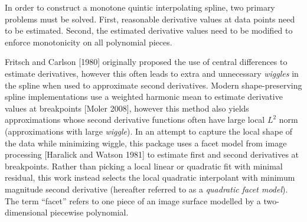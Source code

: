 

In order to construct a monotone quintic interpolating spline, two
primary problems must be solved. First, reasonable derivative values
at data points need to be estimated. Second, the estimated derivative
values need to be modified to enforce monotonicity on all polynomial
pieces.

Fritsch and Carlson [1980] originally proposed the use of central
differences to estimate derivatives, however this often leads to extra
and unnecessary {\it wiggles} in the spline when used to approximate
second derivatives. Modern shape-preserving spline implementations use
a weighted harmonic mean to estimate derivative values at breakpoints
[Moler 2008], however this method also yields approximations whose
second derivative functions often have large local $L^2$ norm
(approximations with large {\it wiggle}). In an attempt to capture the
local shape of the data while minimizing wiggle, this package uses a
facet model from image processing [Haralick and Watson 1981] to
estimate first and second derivatives at breakpoints. Rather than
picking a local linear or quadratic fit with minimal residual, this
work instead selects the local quadratic interpolant with minimum
magnitude second derivative (hereafter referred to as a {\it quadratic
  facet model}). The term ``facet'' refers to one piece of an image
surface modelled by a two-dimensional piecewise polynomial.


